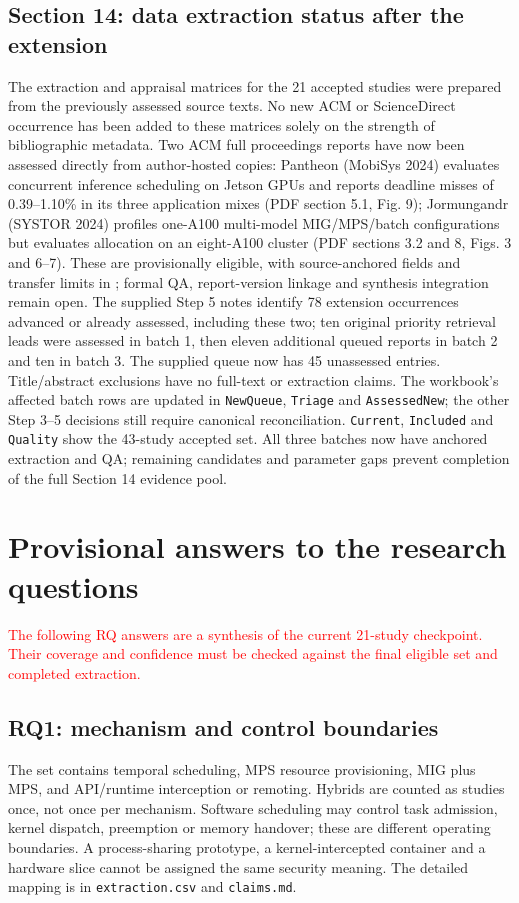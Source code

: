 \documentclass[12pt,a4paper]{article}
\newcommand{\pending}[1]{\textcolor{red}{#1}}
\begin{document}
\subsection{Section 14: data extraction status after the extension}
The extraction and appraisal matrices for the 21 accepted studies were prepared from the previously assessed source texts. No new ACM or ScienceDirect occurrence has been added to these matrices solely on the strength of bibliographic metadata. Two ACM full proceedings reports have now been assessed directly from author-hosted copies: Pantheon (MobiSys 2024) evaluates concurrent inference scheduling on Jetson GPUs and reports deadline misses of 0.39--1.10\% in its three application mixes (PDF section 5.1, Fig. 9); Jormungandr (SYSTOR 2024) profiles one-A100 multi-model MIG/MPS/batch configurations but evaluates allocation on an eight-A100 cluster (PDF sections 3.2 and 8, Figs. 3 and 6--7). These are provisionally eligible, with source-anchored fields and transfer limits in ; formal QA, report-version linkage and synthesis integration remain open. The supplied Step 5 notes identify 78 extension occurrences advanced or already assessed, including these two; ten original priority retrieval leads were assessed in batch 1, then eleven additional queued reports in batch 2 and ten in batch 3. The supplied queue now has 45 unassessed entries. Title/abstract exclusions have no full-text or extraction claims. The workbook's affected batch rows are updated in \texttt{NewQueue}, \texttt{Triage} and \texttt{AssessedNew}; the other Step 3--5 decisions still require canonical reconciliation. \texttt{Current}, \texttt{Included} and \texttt{Quality} show the 43-study accepted set. All three batches now have anchored extraction and QA; remaining candidates and parameter gaps prevent completion of the full Section 14 evidence pool.

\section{Provisional answers to the research questions}
\pending{The following RQ answers are a synthesis of the current 21-study checkpoint. Their coverage and confidence must be checked against the final eligible set and completed extraction.}
\subsection{RQ1: mechanism and control boundaries}
The set contains temporal scheduling, MPS resource provisioning, MIG plus MPS, and API/runtime interception or remoting. Hybrids are counted as studies once, not once per mechanism. Software scheduling may control task admission, kernel dispatch, preemption or memory handover; these are different operating boundaries. A process-sharing prototype, a kernel-intercepted container and a hardware slice cannot be assigned the same security meaning. The detailed mapping is in \texttt{extraction.csv} and \texttt{claims.md}.
\end{document}
